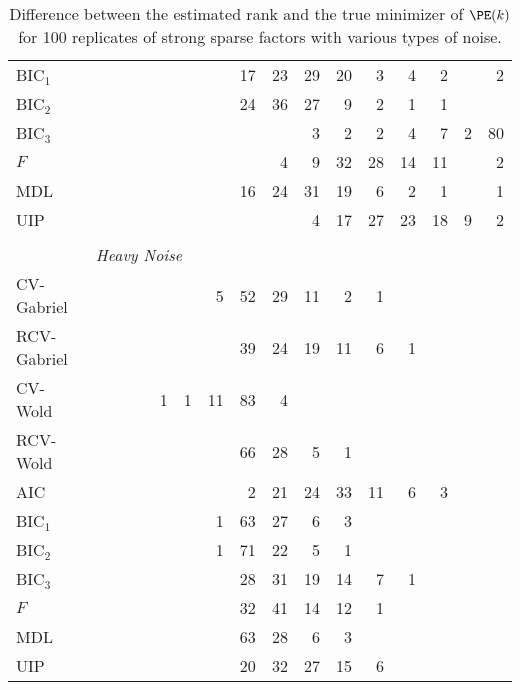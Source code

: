 \begin{table}
\begin{tabular}{lrrrrrrrrrrrrrrrr}
 BIC$_1$ &  &  &  &  &  &  &  &  17 &  23 &  29 &  20 &  3 &  4 &  2 &  &  2\\ 
 BIC$_2$ &  &  &  &  &  &  &  &  24 &  36 &  27 &  9 &  2 &  1 &  1 &  & \\ 
 BIC$_3$ &  &  &  &  &  &  &  &  &  &  3 &  2 &  2 &  4 &  7 &  2 &  80\\ 
 $F$ &  &  &  &  &  &  &  &  &  4 &  9 &  32 &  28 &  14 &  11 &  &  2\\ 
 MDL &  &  &  &  &  &  &  &  16 &  24 &  31 &  19 &  6 &  2 &  1 &  &  1\\ 
 UIP &  &  &  &  &  &  &  &  &  &  4 &  17 &  27 &  23 &  18 &  9 &  2\\ 
        \\
        &\multicolumn{16}{l}{\scriptsize{\textit{Heavy Noise}}} \\
CV-Gabriel &  &  &  &  &  &  &  5 &  52 &  29 &  11 &  2 &  1 &  &  &  & \\ 
 RCV-Gabriel &  &  &  &  &  &  &  &  39 &  24 &  19 &  11 &  6 &  1 &  &  & \\ 
 CV-Wold &  &  &  &  &  1 &  1 &  11 &  83 &  4 &  &  &  &  &  &  & \\ 
 RCV-Wold &  &  &  &  &  &  &  &  66 &  28 &  5 &  1 &  &  &  &  & \\ 
 AIC &  &  &  &  &  &  &  &  2 &  21 &  24 &  33 &  11 &  6 &  3 &  & \\ 
 BIC$_1$ &  &  &  &  &  &  &  1 &  63 &  27 &  6 &  3 &  &  &  &  & \\ 
 BIC$_2$ &  &  &  &  &  &  &  1 &  71 &  22 &  5 &  1 &  &  &  &  & \\ 
 BIC$_3$ &  &  &  &  &  &  &  &  28 &  31 &  19 &  14 &  7 &  1 &  &  & \\ 
 $F$ &  &  &  &  &  &  &  &  32 &  41 &  14 &  12 &  1 &  &  &  & \\ 
 MDL &  &  &  &  &  &  &  &  63 &  28 &  6 &  3 &  &  &  &  & \\ 
 UIP &  &  &  &  &  &  &  &  20 &  32 &  27 &  15 &  6 &  &  &  & \\ 
        \bottomrule
    \end{tabular}
    \caption{
        Difference between the estimated rank and the true minimizer of 
        $\PE(k)$ for 100 replicates of strong sparse factors with various
        types of noise.
    }
\end{table}

